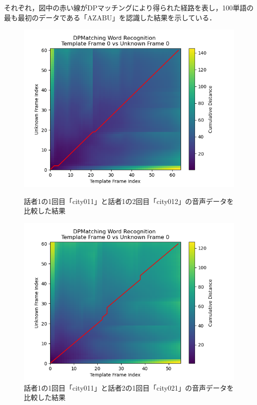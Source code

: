 \documentclass[dvipdfmx,titlepage,a4j]{jsarticle}
\begin{document}
それぞれ，図中の赤い線がDPマッチングにより得られた経路を表し，100単語の最も最初のデータである「AZABU」を認識した結果を示している．

\begin{figure}[htbp]
    \centering
    \begin{minipage}[b]{0.45\linewidth}
        \centering
        \includegraphics[width=\linewidth]{picture/city011_000_vs_city012_000.png}
        \caption{話者1の1回目「city011」と話者1の2回目「city012」の音声データを比較した結果}
        \label{fig:dp_matching_011_012}
    \end{minipage}
    \hspace{0.05\linewidth}
    \begin{minipage}[b]{0.45\linewidth}
        \centering
        \includegraphics[width=\linewidth]{picture/city011_000_vs_city021_000.png}
        \caption{話者1の1回目「city011」と話者2の1回目「city021」の音声データを比較した結果}
        \label{fig:dp_matching_011_021}
    \end{minipage}
\end{figure}
\end{document}
